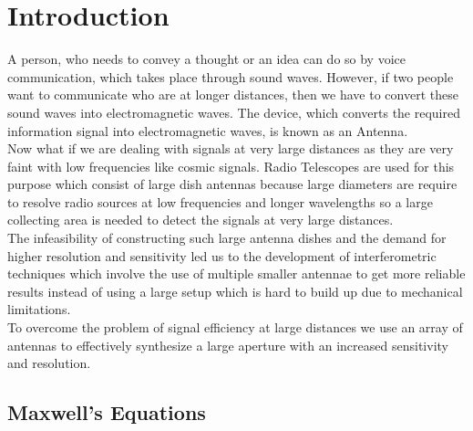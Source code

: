 \chapter{Introduction}

A person, who needs to convey a thought or an idea can do so by voice communication, which takes place through sound waves. However, if two people want to communicate who are at longer distances, then we have to convert these sound waves into electromagnetic waves. The device, which converts the required information signal into electromagnetic waves, is known as an Antenna.\\
Now what if we are dealing with signals at very large distances as they are very faint with low frequencies like cosmic signals. Radio Telescopes are used for this purpose which consist of large dish antennas because large diameters are require to resolve radio sources at low frequencies and longer wavelengths so a large collecting area is needed to detect the signals at very large distances.\\
The infeasibility of constructing such large antenna dishes and the demand for higher resolution and sensitivity led us to the development of interferometric techniques which involve the use of multiple smaller antennae to get more reliable results instead of using a large setup which is hard to build up due to mechanical limitations.\\
To overcome the problem of signal efficiency at large distances we use an array of antennas to effectively synthesize a large aperture with an increased sensitivity and resolution.
 

\section{Maxwell's Equations}

